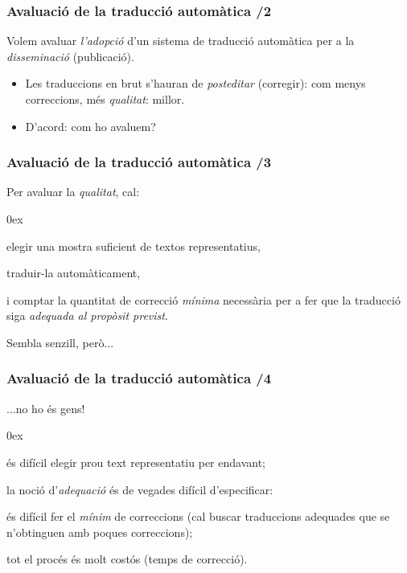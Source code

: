 \documentclass{beamer}
\newcommand{\empha}[1]{\emph{#1}\/}
\begin{document}
\begin{frame}
  \frametitle{ Avaluació de la traducció automàtica /2}
{
{Volem avaluar \empha{l'adopció} d'un sistema de traducció
  automàtica per a la \empha{disseminació} (publicació).}
\begin{itemize}
\item Les traduccions en brut s'hauran de \empha{posteditar} (corregir): com
  menys correccions, més \empha{qualitat}: millor.
\item D'acord: com ho avaluem?
\end{itemize}


}
\end{frame}
\begin{frame}
  \frametitle{ Avaluació de la traducció automàtica /3}
{
{Per avaluar la \empha{qualitat}, cal:}
\begin{itemize}\itemsep 0ex
{\item elegir una mostra suficient de textos representatius,}
{\item traduir-la automàticament,}
{\item i comptar la quantitat de correcció \empha{mínima} necessària per
  a fer que la traducció siga \empha{adequada al propòsit previst}.}
\end{itemize}
{Sembla senzill, però...}


}
\end{frame}
\begin{frame}
  \frametitle{ Avaluació de la traducció automàtica /4}
{
{...no ho és gens!}
\begin{itemize}\itemsep 0ex
{\item és difícil elegir prou text representatiu per endavant;}
{\item la noció d'\empha{adequació} és de vegades difícil d'especificar:}
{\item és difícil fer el \empha{mínim} de correccions (cal buscar
  traduccions adequades que se n'obtinguen amb poques correccions);}
{\item tot el procés és molt costós (temps de correcció).}
\end{itemize}

}
\end{frame}
\end{document}
